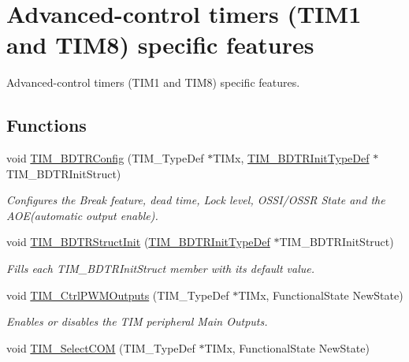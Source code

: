 \hypertarget{group___t_i_m___group4}{\section{Advanced-\/control timers (T\-I\-M1 and T\-I\-M8) specific features}
\label{group___t_i_m___group4}
}


Advanced-\/control timers (T\-I\-M1 and T\-I\-M8) specific features.  


\subsection*{Functions}
\begin{DoxyCompactItemize}
\item 
void \hyperlink{group___t_i_m___group4_ga3df4ba3f0727f63ce621e2b2e6035d4f}{T\-I\-M\-\_\-\-B\-D\-T\-R\-Config} (T\-I\-M\-\_\-\-Type\-Def $\ast$T\-I\-Mx, \hyperlink{struct_t_i_m___b_d_t_r_init_type_def}{T\-I\-M\-\_\-\-B\-D\-T\-R\-Init\-Type\-Def} $\ast$T\-I\-M\-\_\-\-B\-D\-T\-R\-Init\-Struct)
\begin{DoxyCompactList}\small\item\em Configures the Break feature, dead time, Lock level, O\-S\-S\-I/\-O\-S\-S\-R State and the A\-O\-E(automatic output enable). \end{DoxyCompactList}\item 
void \hyperlink{group___t_i_m___group4_gaea0f49938cda8ae0738162194798afc6}{T\-I\-M\-\_\-\-B\-D\-T\-R\-Struct\-Init} (\hyperlink{struct_t_i_m___b_d_t_r_init_type_def}{T\-I\-M\-\_\-\-B\-D\-T\-R\-Init\-Type\-Def} $\ast$T\-I\-M\-\_\-\-B\-D\-T\-R\-Init\-Struct)
\begin{DoxyCompactList}\small\item\em Fills each T\-I\-M\-\_\-\-B\-D\-T\-R\-Init\-Struct member with its default value. \end{DoxyCompactList}\item 
void \hyperlink{group___t_i_m___group4_ga3e59ebced2ab8e0b817c460f1670e97d}{T\-I\-M\-\_\-\-Ctrl\-P\-W\-M\-Outputs} (T\-I\-M\-\_\-\-Type\-Def $\ast$T\-I\-Mx, Functional\-State New\-State)
\begin{DoxyCompactList}\small\item\em Enables or disables the T\-I\-M peripheral Main Outputs. \end{DoxyCompactList}\item 
void \hyperlink{group___t_i_m___group4_gaff2e7f9959b1b36e830df028c14accc8}{T\-I\-M\-\_\-\-Select\-C\-O\-M} (T\-I\-M\-\_\-\-Type\-Def $\ast$T\-I\-Mx, Functional\-State New\-State)

\end{DoxyCompactItemize}
